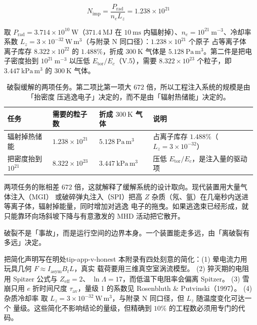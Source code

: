 \begin{equation}
N_{\mathrm{imp}} = \frac{P_{\mathrm{rad}}}{n_e L_z} = 1.238\times10^{21}
\label{eq:app-v-impurity}
\end{equation}

取 $P_{\mathrm{rad}}=3.714\times10^{10}\ \mathrm{W}$（$371.4\ \mathrm{MJ}$ 在
$10\ \mathrm{ms}$ 内辐射掉）、$n_e=10^{21}\ \mathrm{m^{-3}}$、冷却率系数
$L_z=3\times10^{-32}\ \mathrm{W\,m^3}$（与附录 N 同口径）：$1.238\times10^{21}$ 个原子
占等离子体离子库存 $8.322\times10^{22}$ 的 $1.488\%$，折成 $300\ \mathrm{K}$ 气体是
$5.128\ \mathrm{Pa\,m^3}$。第二件是把电子密度抬到 $10^{21}\ \mathrm{m^{-3}}$ 以压低
$E_{\mathrm{tor}}/E_c$（V.5），需要 $8.322\times10^{23}$ 个粒子，即
$3.447\ \mathrm{kPa\,m^3}$ 的 $300\ \mathrm{K}$ 气体。

\begin{table}[htbp]
\centering
\small
\caption{破裂缓解的两项任务。第二项比第一项大 $672$ 倍，所以工程注入系统的规模是由「抬密度
压逃逸电子」决定的，而不是由「辐射热储能」决定的。}
\label{tab:app-v-mitigation}
\begin{tabular}{@{}p{2.4cm}p{2.8cm}p{2.6cm}p{3.4cm}@{}}
\toprule
任务 & 需要的粒子数 & 折成 $300\ \mathrm{K}$ 气体 & 说明 \\
\midrule
辐射掉热储能 & $1.238\times10^{21}$ & $5.128\ \mathrm{Pa\,m^3}$ & 占离子库存 $1.488\%$（$L_z=3\times10^{-32}$） \\
把密度抬到 $10^{21}$ & $8.322\times10^{23}$ & $3.447\ \mathrm{kPa\,m^3}$ & 压低 $E_{\mathrm{tor}}/E_c$，是注入量的驱动项 \\
\bottomrule
\end{tabular}

\end{table}

两项任务的账相差 $672$ 倍，这就解释了缓解系统的设计取向。现代装置用大量气体注入（MGI）
或破碎弹丸注入（SPI）把高 $Z$ 杂质（氖、氩）在几毫秒内送进等离子体，辐射掉能量，同时增加对逃逸
电子的拖曳。如果逃逸束已经形成，就只能靠环向场斜坡下降与有意激发的 MHD 活动把它散开。

破裂不是「事故」，而是运行空间的边界本身。一个装置能走多远，由「离破裂有多远」决定。

\begin{tip}{把简化声明写在明处}{tip-app-v-honest}
本附录有四处刻意的简化：(1) 晕电流力用玩具几何 $F\approx I_{\mathrm{asym}}B_tL$，真实
载荷要用三维真空室涡流模型。
(2) 猝灭期的电阻用 Spitzer 公式与 $Z_{\mathrm{eff}}=2$、
$\ln\Lambda=17$，而低温下电阻率会偏离 Spitzer。
(3) 雪崩只用 $e$ 折时间尺度
$\tau_{\mathrm{av}}$，量级 1 的系数见 Rosenbluth \& Putvinski（1997）。
(4) 杂质冷却率
取 $L_z=3\times10^{-32}\ \mathrm{W\,m^3}$，与附录 N 同口径，但 $L_z$ 随温度变化可达一个
量级。这些简化不影响结论的量级，但精确到 $10\%$ 的工程数必须用专门的代码。
\end{tip}

